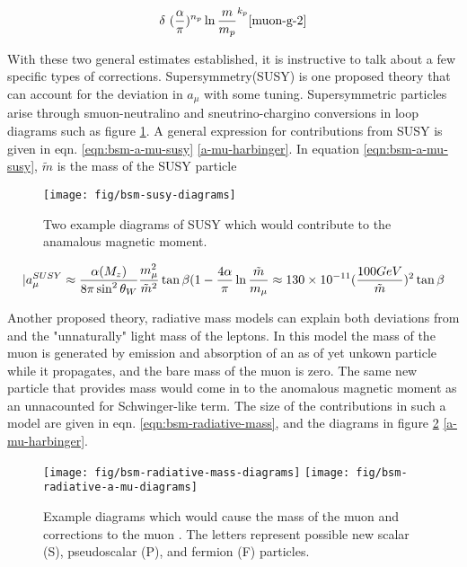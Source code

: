 \begin{equation}
\label{eqn:bsm-general-large-m}
\delta ~ (\frac{\alpha}{\pi})^{n_p} \ln{\frac{m}{m_p}}^{k_p} \ref{muon-g-2}
\end{equation}

With these two general estimates established, it is instructive to talk about a few specific types of corrections.  Supersymmetry(SUSY) is one proposed theory that can account for the deviation in $a_\mu$ with some tuning.  Supersymmetric particles arise through smuon-neutralino and sneutrino-chargino conversions in loop diagrams such as figure \ref{fig:bsm-susy-diagrams}.  A general expression for contributions from SUSY is given in eqn. \ref{eqn:bsm-a-mu-susy} \ref{a-mu-harbinger}.  In equation \ref{eqn:bsm-a-mu-susy}, $\tilde{m}$ is the mass of the SUSY particle

\begin{figure}
\label{fig:bsm-susy-diagrams}
\texttt{[image: fig/bsm-susy-diagrams]}
\caption{Two example diagrams of SUSY which would contribute to the anamalous magnetic moment.}
\end{figure}

\begin{equation}
\label{eqn:bsm-a-mu-susy}
|a_\mu^{SUSY} \approx \frac{\alpha(M_z)}{8 \pi \sin^2{\theta_W}} \\
\frac{m_\mu^2}{\tilde{m}^2} \tan{\beta} \\
(1 - \frac{4\alpha}{\pi}\ln{\frac{\tilde{m}}{m_\mu}} \\
\approx 130 \times 10^{-11} (\frac{100 GeV}{\tilde{m}})^2 \tan{\beta}
\end{equation}

Another proposed theory, radiative mass models can explain both deviations from \gmtwo and the "unnaturally" light mass of the leptons.  In this model the mass of the muon is generated by emission and absorption of an as of yet unkown particle while it propagates, and the bare mass of the muon is zero.  The same new particle that provides mass would come in to the anomalous magnetic moment as an unnacounted for Schwinger-like term.  The size of the contributions in such a model are given in eqn. \ref{eqn:bsm-radiative-mass}, and the diagrams in figure \ref{fig:bsm-radiative-diagrams} \ref{a-mu-harbinger}.

\begin{figure}
\label{fig:bsm-radiative-diagrams}
\texttt{[image: fig/bsm-radiative-mass-diagrams]}
\texttt{[image: fig/bsm-radiative-a-mu-diagrams]}
\caption{Example diagrams which would cause the mass of the muon and corrections to the muon \gmtwo.  The letters represent possible new scalar (S), pseudoscalar (P), and fermion (F) particles.}
\end{figure}

